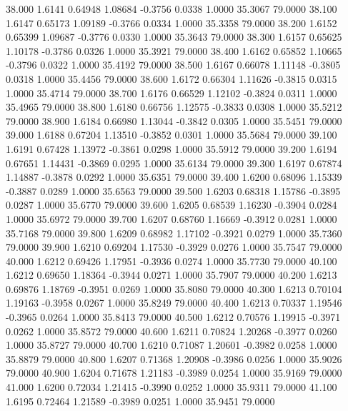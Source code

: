   38.000   1.6141   0.64948   1.08684  -0.3756   0.0338   1.0000  35.3067  79.0000
  38.100   1.6147   0.65173   1.09189  -0.3766   0.0334   1.0000  35.3358  79.0000
  38.200   1.6152   0.65399   1.09687  -0.3776   0.0330   1.0000  35.3643  79.0000
  38.300   1.6157   0.65625   1.10178  -0.3786   0.0326   1.0000  35.3921  79.0000
  38.400   1.6162   0.65852   1.10665  -0.3796   0.0322   1.0000  35.4192  79.0000
  38.500   1.6167   0.66078   1.11148  -0.3805   0.0318   1.0000  35.4456  79.0000
  38.600   1.6172   0.66304   1.11626  -0.3815   0.0315   1.0000  35.4714  79.0000
  38.700   1.6176   0.66529   1.12102  -0.3824   0.0311   1.0000  35.4965  79.0000
  38.800   1.6180   0.66756   1.12575  -0.3833   0.0308   1.0000  35.5212  79.0000
  38.900   1.6184   0.66980   1.13044  -0.3842   0.0305   1.0000  35.5451  79.0000
  39.000   1.6188   0.67204   1.13510  -0.3852   0.0301   1.0000  35.5684  79.0000
  39.100   1.6191   0.67428   1.13972  -0.3861   0.0298   1.0000  35.5912  79.0000
  39.200   1.6194   0.67651   1.14431  -0.3869   0.0295   1.0000  35.6134  79.0000
  39.300   1.6197   0.67874   1.14887  -0.3878   0.0292   1.0000  35.6351  79.0000
  39.400   1.6200   0.68096   1.15339  -0.3887   0.0289   1.0000  35.6563  79.0000
  39.500   1.6203   0.68318   1.15786  -0.3895   0.0287   1.0000  35.6770  79.0000
  39.600   1.6205   0.68539   1.16230  -0.3904   0.0284   1.0000  35.6972  79.0000
  39.700   1.6207   0.68760   1.16669  -0.3912   0.0281   1.0000  35.7168  79.0000
  39.800   1.6209   0.68982   1.17102  -0.3921   0.0279   1.0000  35.7360  79.0000
  39.900   1.6210   0.69204   1.17530  -0.3929   0.0276   1.0000  35.7547  79.0000
  40.000   1.6212   0.69426   1.17951  -0.3936   0.0274   1.0000  35.7730  79.0000
  40.100   1.6212   0.69650   1.18364  -0.3944   0.0271   1.0000  35.7907  79.0000
  40.200   1.6213   0.69876   1.18769  -0.3951   0.0269   1.0000  35.8080  79.0000
  40.300   1.6213   0.70104   1.19163  -0.3958   0.0267   1.0000  35.8249  79.0000
  40.400   1.6213   0.70337   1.19546  -0.3965   0.0264   1.0000  35.8413  79.0000
  40.500   1.6212   0.70576   1.19915  -0.3971   0.0262   1.0000  35.8572  79.0000
  40.600   1.6211   0.70824   1.20268  -0.3977   0.0260   1.0000  35.8727  79.0000
  40.700   1.6210   0.71087   1.20601  -0.3982   0.0258   1.0000  35.8879  79.0000
  40.800   1.6207   0.71368   1.20908  -0.3986   0.0256   1.0000  35.9026  79.0000
  40.900   1.6204   0.71678   1.21183  -0.3989   0.0254   1.0000  35.9169  79.0000
  41.000   1.6200   0.72034   1.21415  -0.3990   0.0252   1.0000  35.9311  79.0000
  41.100   1.6195   0.72464   1.21589  -0.3989   0.0251   1.0000  35.9451  79.0000
